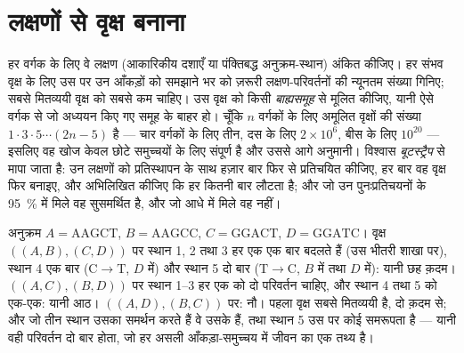 \section{लक्षणों से वृक्ष बनाना}

\begin{method}[मितव्ययिता]\label{meth:b2:phylogenetic-trees:parsimony}
हर वर्गक के लिए वे लक्षण (आकारिकीय दशाएँ या पंक्तिबद्ध
अनुक्रम-स्थान) अंकित कीजिए। हर संभव वृक्ष के लिए उस पर उन आँकड़ों को समझाने भर को
ज़रूरी लक्षण-परिवर्तनों की न्यूनतम संख्या गिनिए;
सबसे मितव्ययी वृक्ष को सबसे कम चाहिए। उस वृक्ष को किसी
\emph{बाह्यसमूह} से मूलित कीजिए, यानी ऐसे वर्गक से जो अध्ययन किए गए समूह के बाहर हो।
चूँकि $n$ वर्गकों के लिए अमूलित वृक्षों की संख्या $1\cdot 3\cdot
5\cdots(2n - 5)$ है --- चार वर्गकों के लिए तीन, दस के लिए $2\times 10^{6}$,
बीस के लिए $10^{20}$ --- इसलिए वह खोज केवल छोटे समुच्चयों के लिए
संपूर्ण है और उससे आगे अनुमानी। विश्वास
\emph{बूटस्ट्रैप} से मापा जाता है: उन लक्षणों को प्रतिस्थापन के साथ हज़ार
बार फिर से प्रतिचयित कीजिए, हर बार वह वृक्ष फिर बनाइए, और अभिलिखित कीजिए कि
हर  कितनी बार लौटता है; और जो  उन पुनःप्रतिचयनों के \qty{95}{\%} में मिले वह
सुसमर्थित है, और जो आधे में मिले वह नहीं।
\end{method}

\begin{example}[चार वर्गक, पाँच स्थान]\label{ex:b2:phylogenetic-trees:parsimony}
अनुक्रम $A = \mathrm{AAGCT}$, $B = \mathrm{AAGCC}$, $C =
\mathrm{GGACT}$, $D = \mathrm{GGATC}$। वृक्ष $((A,B),(C,D))$ पर
स्थान 1, 2 तथा 3 हर एक एक बार बदलते हैं (उस भीतरी शाखा पर), स्थान 4
एक बार ($\mathrm{C}\to\mathrm{T}$, $D$ में) और स्थान 5 दो बार
($\mathrm{T}\to\mathrm{C}$, $B$ में तथा $D$ में): यानी छह क़दम।
$((A,C),(B,D))$ पर स्थान 1--3 हर एक को दो परिवर्तन चाहिए, और स्थान 4 तथा 5 को
एक-एक: यानी आठ। $((A,D),(B,C))$ पर: नौ। पहला वृक्ष सबसे
मितव्ययी है, दो क़दम से; और जो तीन स्थान उसका समर्थन करते हैं वे
उसके  हैं, तथा स्थान 5 उस पर कोई समरूपता है --- यानी वही
परिवर्तन दो बार होता, जो हर असली आँकड़ा-समुच्चय में जीवन का एक तथ्य है।
\end{example}

